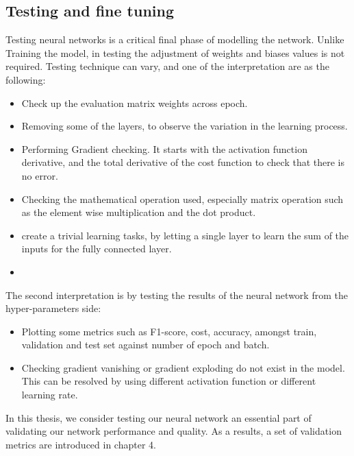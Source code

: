 \subsection{Testing and fine tuning}
\hspace{5mm} Testing neural networks is a critical final phase of modelling the network. Unlike Training the model, in testing the adjustment of weights and biases values is not required. Testing technique can vary, and one of the interpretation are as the following:
\begin{itemize}
    \item Check up the evaluation matrix weights across epoch.
    \item Removing some of the layers, to observe the variation in the learning process.
    \item Performing Gradient checking. It starts with the activation function derivative, and the total derivative of the cost function to check that there is no error.
    \item Checking the mathematical operation used, especially matrix operation such as the element wise multiplication and the dot product.
    \item create a trivial learning tasks, by letting a single layer to learn the sum of the inputs for the fully connected layer. 
    \item 
\end{itemize}
\hspace{5mm} The second interpretation is by testing the results of the neural network from the hyper-parameters side:
\begin{itemize}
    \item Plotting some metrics such as F1-score, cost, accuracy, amongst train, validation and test set against number of epoch and batch.
    \item Checking gradient vanishing or gradient exploding do not exist in the model. This can be resolved by using different activation function or different learning rate.
\end{itemize}
\hspace{5mm} In this thesis, we consider testing our neural network an essential part of validating our network performance and quality. As a results, a set of validation metrics are introduced in chapter 4. 

